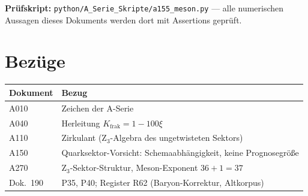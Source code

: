 \medskip\noindent\textbf{Prüfskript:} \texttt{python/A\_Serie\_Skripte/a155\_meson.py}
--- alle numerischen Aussagen dieses Dokuments werden dort mit Assertions geprüft.

\section{Bezüge}

\begin{center}
{\small\begin{tabular}{ll}
\toprule
Dokument & Bezug \\
\midrule
A010 & Zeichen der A-Serie \\
A040 & Herleitung $K_\text{frak} = 1-100\xi$ \\
A110 & Zirkulant (Z$_3$-Algebra des ungetwisteten Sektors) \\
A150 & Quarksektor-Vorsicht: Schemaabhängigkeit, keine Prognosegröße \\
A270 & Z$_3$-Sektor-Struktur, Meson-Exponent $36+1=37$ \\
Dok.~190 & P35, P40; Register R62 (Baryon-Korrektur, Altkorpus) \\
\bottomrule
\end{tabular}}
\end{center}
